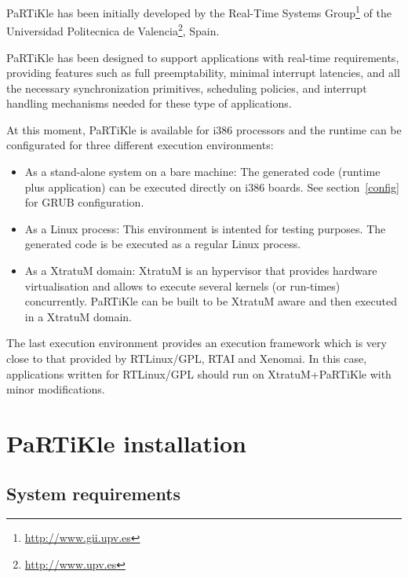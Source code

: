 \documentclass[a4paper,10pt,twoside]{report}
\newcommand{\partikle}[0]{PaRTiKle}
\newcommand{\xtratum}[0]{XtratuM}
\begin{document}
\partikle{} has been initially developed by the Real-Time Systems
Group\footnote{\url{http://www.gii.upv.es}} of the Universidad
Politecnica de Valencia\footnote{\url{http://www.upv.es}}, Spain.


\partikle{} has been designed to support applications with real-time
requirements, providing features such as full preemptability, minimal
interrupt latencies, and all the necessary synchronization primitives,
scheduling policies, and interrupt handling mechanisms needed for
these type of applications.

At this moment, \partikle{} is available for i386 processors and the
runtime can be configurated for three different execution
environments:
\begin{itemize}
\item As a stand-alone system on a bare machine: The generated code
  (runtime plus application) can be executed directly on i386 boards.
  See section~\ref{config} for GRUB configuration.
\item As a Linux process: This environment is intented for testing
  purposes. The generated code is be executed as a regular Linux
  process.
\item As a \xtratum{} domain: \xtratum{} is an hypervisor that provides
  hardware virtualisation and allows to execute several kernels (or
  run-times) concurrently. \partikle{} can be built to be \xtratum{} aware
  and then executed in a \xtratum{} domain.
\end{itemize}

The last execution environment provides an execution framework which
is very close to that provided by RTLinux/GPL, RTAI and Xenomai. In
this case, applications written for RTLinux/GPL should run on
\xtratum{}+\partikle{} with minor modifications.

\chapter{PaRTiKle installation}
\section{System requirements}
\end{document}
